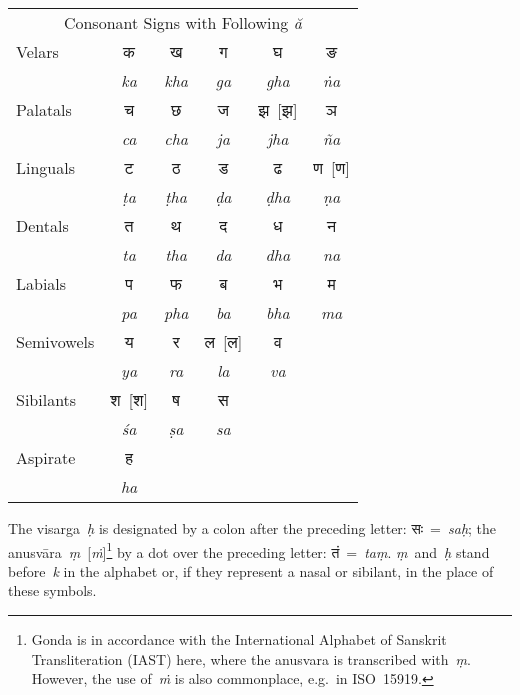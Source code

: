 \documentclass{article}
\newcommand{\siddhanta}[1]{\mbox{\Siddhanta#1}}
\newcommand{\siddhantaII}[1]{\mbox{\SiddhantaII#1}}
\newcommand{\lingual}[1]{\textit{#1}}
\newcommand{\alt}[2]{#1~[#2]}
\newcommand{\siddhantasiddhantaII}[2]{\alt{\siddhanta{#1}}{\siddhantaII{#2}}}
\newcommand{\siddhantaIIsiddhanta}[2]{\alt{\siddhantaII{#1}}{\siddhanta{#2}}}
\begin{document}
\begin{center}
	\def\arraystretch{1.5}
	\begin{tabular}{lccccc}
		\multicolumn{6}{c}{Consonant Signs with Following \lingual{ă}}\\
		Velars & \siddhanta{क} & \siddhanta{ख} & \siddhanta{ग} & \siddhanta{घ} & \siddhanta{ङ}\\
		 & \lingual{ka} & \lingual{kha} & \lingual{ga} & \lingual{gha} & \lingual{ṅa}\\
		Palatals & \siddhanta{च} & \siddhanta{छ} & \siddhanta{ज} & \siddhantaIIsiddhanta{झ}{झ} & \siddhanta{ञ}\\
		 & \lingual{ca} & \lingual{cha} & \lingual{ja} & \lingual{jha} & \lingual{ña}\\
		Linguals & \siddhanta{ट} & \siddhanta{ठ} & \siddhanta{ड} & \siddhanta{ढ} & \siddhantaIIsiddhanta{ण}{ण}\\
		 & \lingual{ṭa} & \lingual{ṭha} & \lingual{ḍa} & \lingual{ḍha} & \lingual{ṇa}\\
		Dentals & \siddhanta{त} & \siddhanta{थ} & \siddhanta{द} & \siddhanta{ध} & \siddhanta{न}\\
		 & \lingual{ta} & \lingual{tha} & \lingual{da} & \lingual{dha} & \lingual{na}\\
		Labials & \siddhanta{प} & \siddhanta{फ} & \siddhanta{ब} & \siddhanta{भ} & \siddhanta{म}\\
		 & \lingual{pa} & \lingual{pha} & \lingual{ba} & \lingual{bha} & \lingual{ma}\\
		Semivowels & \siddhanta{य} & \siddhanta{र} & \siddhantaIIsiddhanta{ल}{ल} & \siddhanta{व}\\
		 & \lingual{ya} & \lingual{ra} & \lingual{la} & \lingual{va}\\
		Sibilants & \siddhantasiddhantaII{श}{श} & \siddhanta{ष} & \siddhanta{स}\\
		 & \lingual{śa} & \lingual{ṣa} & \lingual{sa}\\
		Aspirate & \siddhanta{ह}\\
		 & \lingual{ha}\\
	\end{tabular}
\end{center}

\clearpage

The visarga~\lingual{ḥ} is designated by a colon after the preceding letter: \siddhanta{सः}~=~\lingual{saḥ}; the anusvāra~\alt{\lingual{ṃ}}{\lingual{ṁ}}\footnote{Gonda is in accordance with the International Alphabet of Sanskrit Transliteration (IAST) here, where the anusvara is transcribed with~\lingual{ṃ}. However, the use of~\lingual{ṁ} is also commonplace, e.g.~in ISO~15919.} by a dot over the preceding letter: \siddhanta{तं}~=~\lingual{taṃ}. \lingual{ṃ}~and~\lingual{ḥ} stand before~\lingual{k} in the alphabet or, if they represent a nasal or sibilant, in the place of these symbols.
\end{document}
